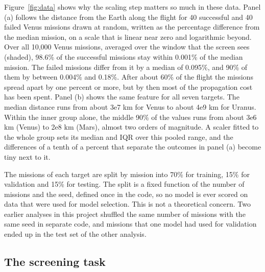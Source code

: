 Figure~\ref{fig:data} shows why the scaling step matters so much in these data. Panel (a) follows the distance from the Earth along the flight for 40 successful and 40 failed Venus missions drawn at random, written as the percentage difference from the median mission, on a scale that is linear near zero and logarithmic beyond. Over all 10,000 Venus missions, averaged over the window that the screen sees (shaded), 98.6\% of the successful missions stay within 0.001\% of the median mission. The failed missions differ from it by a median of 0.095\%, and 90\% of them by between 0.004\% and 0.18\%. After about 60\% of the flight the missions spread apart by one percent or more, but by then most of the propagation cost has been spent. Panel (b) shows the same feature for all seven targets. The median distance runs from about 3e7 km for Venus to about 4e9 km for Uranus. Within the inner group alone, the middle 90\% of the values runs from about 3e6 km (Venus) to 2e8 km (Mars), almost two orders of magnitude. A scaler fitted to the whole group sets its median and IQR over this pooled range, and the differences of a tenth of a percent that separate the outcomes in panel (a) become tiny next to it.

The missions of each target are split by mission into 70\% for training, 15\% for validation and 15\% for testing. The split is a fixed function of the number of missions and the seed, defined once in the code, so no model is ever scored on data that were used for model selection. This is not a theoretical concern. Two earlier analyses in this project shuffled the same number of missions with the same seed in separate code, and missions that one model had used for validation ended up in the test set of the other analysis.

\subsection{The screening task}
\label{sec:task}

